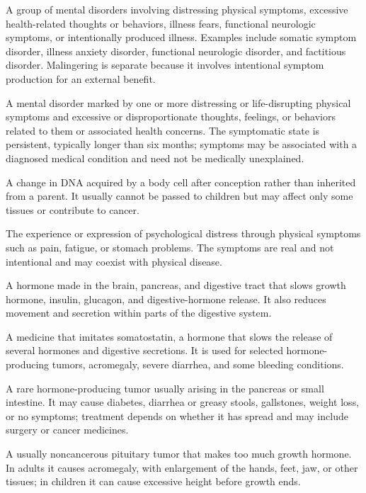  A group of mental disorders involving distressing physical symptoms, excessive health-related thoughts or behaviors, illness fears, functional neurologic symptoms, or intentionally produced illness. Examples include somatic symptom disorder, illness anxiety disorder, functional neurologic disorder, and factitious disorder. Malingering is separate because it involves intentional symptom production for an external benefit.

 A mental disorder marked by one or more distressing or life-disrupting physical symptoms and excessive or disproportionate thoughts, feelings, or behaviors related to them or associated health concerns. The symptomatic state is persistent, typically longer than six months; symptoms may be associated with a diagnosed medical condition and need not be medically unexplained.

 A change in DNA acquired by a body cell after conception rather than inherited from a parent. It usually cannot be passed to children but may affect only some tissues or contribute to cancer.

 The experience or expression of psychological distress through physical symptoms such as pain, fatigue, or stomach problems. The symptoms are real and not intentional and may coexist with physical disease.

 A hormone made in the brain, pancreas, and digestive tract that slows growth hormone, insulin, glucagon, and digestive-hormone release. It also reduces movement and secretion within parts of the digestive system.

 A medicine that imitates somatostatin, a hormone that slows the release of several hormones and digestive secretions. It is used for selected hormone-producing tumors, acromegaly, severe diarrhea, and some bleeding conditions.

 A rare hormone-producing tumor usually arising in the pancreas or small intestine. It may cause diabetes, diarrhea or greasy stools, gallstones, weight loss, or no symptoms; treatment depends on whether it has spread and may include surgery or cancer medicines.

 A usually noncancerous pituitary tumor that makes too much growth hormone. In adults it causes acromegaly, with enlargement of the hands, feet, jaw, or other tissues; in children it can cause excessive height before growth ends.

